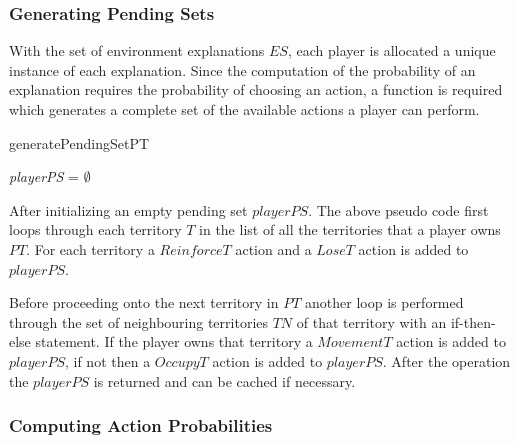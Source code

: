 \documentclass[parskip]{cs4rep}
\begin{document}
\subsubsection{Generating Pending Sets}

With the set of environment explanations $ES$, each player is allocated a unique instance of each explanation. Since the computation of the probability of an explanation requires the probability of choosing an action, a function is required which generates a complete set of the available actions a player can perform.

\begin{pseudocode}[ruled]{generatePendingSet}{PT}
\begin{algorithm}[H]
\textit{playerPS} = $\emptyset$

\end{algorithm}
\end{pseudocode}

After initializing an empty pending set $playerPS$. The above pseudo code first loops through each territory $T$ in the list of all the territories that a player owns $PT$. For each territory a $ReinforceT$ action and a $LoseT$ action is added to $playerPS$. 

Before proceeding onto the next territory in $PT$ another loop is performed through the set of neighbouring territories $TN$ of that territory with an if-then-else statement. If the player owns that territory a $MovementT$ action is added to $playerPS$, if not then a $OccupyT$ action is added to $playerPS$. After the operation the $playerPS$ is returned and can be cached if necessary.

\newpage

\subsubsection{Computing Action Probabilities}
\end{document}
